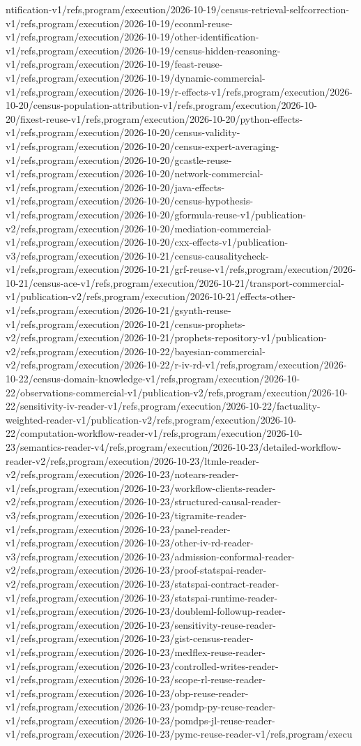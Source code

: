 \documentclass[11pt,a4paper,openany]{book}
\begin{document}
ntification-v1/refs,program/execution/2026-10-19/census-retrieval-selfcorrection-v1/refs,program/execution/2026-10-19/econml-reuse-v1/refs,program/execution/2026-10-19/other-identification-v1/refs,program/execution/2026-10-19/census-hidden-reasoning-v1/refs,program/execution/2026-10-19/feast-reuse-v1/refs,program/execution/2026-10-19/dynamic-commercial-v1/refs,program/execution/2026-10-19/r-effects-v1/refs,program/execution/2026-10-20/census-population-attribution-v1/refs,program/execution/2026-10-20/fixest-reuse-v1/refs,program/execution/2026-10-20/python-effects-v1/refs,program/execution/2026-10-20/census-validity-v1/refs,program/execution/2026-10-20/census-expert-averaging-v1/refs,program/execution/2026-10-20/gcastle-reuse-v1/refs,program/execution/2026-10-20/network-commercial-v1/refs,program/execution/2026-10-20/java-effects-v1/refs,program/execution/2026-10-20/census-hypothesis-v1/refs,program/execution/2026-10-20/gformula-reuse-v1/publication-v2/refs,program/execution/2026-10-20/mediation-commercial-v1/refs,program/execution/2026-10-20/cxx-effects-v1/publication-v3/refs,program/execution/2026-10-21/census-causalitycheck-v1/refs,program/execution/2026-10-21/grf-reuse-v1/refs,program/execution/2026-10-21/census-ace-v1/refs,program/execution/2026-10-21/transport-commercial-v1/publication-v2/refs,program/execution/2026-10-21/effects-other-v1/refs,program/execution/2026-10-21/gsynth-reuse-v1/refs,program/execution/2026-10-21/census-prophets-v2/refs,program/execution/2026-10-21/prophets-repository-v1/publication-v2/refs,program/execution/2026-10-22/bayesian-commercial-v2/refs,program/execution/2026-10-22/r-iv-rd-v1/refs,program/execution/2026-10-22/census-domain-knowledge-v1/refs,program/execution/2026-10-22/observations-commercial-v1/publication-v2/refs,program/execution/2026-10-22/sensitivity-iv-reader-v1/refs,program/execution/2026-10-22/factuality-weighted-reader-v1/publication-v2/refs,program/execution/2026-10-22/computation-workflow-reader-v1/refs,program/execution/2026-10-23/semantics-reader-v4/refs,program/execution/2026-10-23/detailed-workflow-reader-v2/refs,program/execution/2026-10-23/ltmle-reader-v2/refs,program/execution/2026-10-23/notears-reader-v1/refs,program/execution/2026-10-23/workflow-clients-reader-v2/refs,program/execution/2026-10-23/structured-causal-reader-v3/refs,program/execution/2026-10-23/tigramite-reader-v1/refs,program/execution/2026-10-23/panel-reader-v1/refs,program/execution/2026-10-23/other-iv-rd-reader-v3/refs,program/execution/2026-10-23/admission-conformal-reader-v2/refs,program/execution/2026-10-23/proof-statspai-reader-v2/refs,program/execution/2026-10-23/statspai-contract-reader-v1/refs,program/execution/2026-10-23/statspai-runtime-reader-v1/refs,program/execution/2026-10-23/doubleml-followup-reader-v1/refs,program/execution/2026-10-23/sensitivity-reuse-reader-v1/refs,program/execution/2026-10-23/gist-census-reader-v1/refs,program/execution/2026-10-23/medflex-reuse-reader-v1/refs,program/execution/2026-10-23/controlled-writes-reader-v1/refs,program/execution/2026-10-23/scope-rl-reuse-reader-v1/refs,program/execution/2026-10-23/obp-reuse-reader-v1/refs,program/execution/2026-10-23/pomdp-py-reuse-reader-v1/refs,program/execution/2026-10-23/pomdps-jl-reuse-reader-v1/refs,program/execution/2026-10-23/pymc-reuse-reader-v1/refs,program/execu
\end{document}
